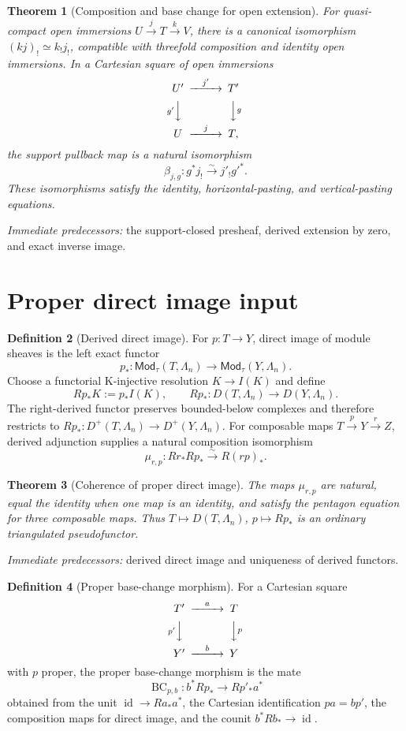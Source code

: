 \documentclass[10pt]{article}
\newtheorem{theorem}{Theorem}[section]
\theoremstyle{definition}
\newtheorem{definition}[theorem]{Definition}
\newcommand{\Mod}{\mathsf{Mod}}
\newcommand{\pred}[1]{\par\smallskip\begingroup\footnotesize\raggedright
\emph{Immediate predecessors:} #1.\par\endgroup}
\begin{document}
\begin{theorem}[Composition and base change for open extension]
For quasi-compact open immersions \(U\xrightarrow{j}T\xrightarrow{k}V\),
there is a canonical isomorphism
\((kj)_!\simeq k_!j_!\), compatible with threefold composition and identity
open immersions.  In a Cartesian square of open immersions
\[
\begin{CD}
 U'@>{j'}>>T'\\
 @V{g'}VV @VV{g}V\\
 U@>{j}>>T,
\end{CD}
\]
the support pullback map is a natural isomorphism
\[
 \beta_{j,g}:g^*j_!\xrightarrow{\sim}j'_!g'^*.
\]
These isomorphisms satisfy the identity, horizontal-pasting, and
vertical-pasting equations.
\end{theorem}
\pred{the support-closed presheaf, derived extension by zero, and exact inverse image}

\section{Proper direct image input}

\begin{definition}[Derived direct image]
For \(p:T\to Y\), direct image of module sheaves is the left exact functor
\[
 p_*:\Mod_\tau(T,\Lambda_n)\longrightarrow
      \Mod_\tau(Y,\Lambda_n).
\]
Choose a functorial K-injective resolution \(K\to I(K)\) and define
\[
 Rp_*K:=p_*I(K),\qquad
 Rp_*:D(T,\Lambda_n)\longrightarrow D(Y,\Lambda_n).
\]
The right-derived functor preserves bounded-below complexes and therefore
restricts to \(Rp_*:D^+(T,\Lambda_n)\to D^+(Y,\Lambda_n)\).
For composable maps \(T\xrightarrow{p}Y\xrightarrow{r}Z\), derived
adjunction supplies a natural composition isomorphism
\[
 \mu_{r,p}:Rr_*Rp_*\xrightarrow{\sim}R(rp)_*.
\]
\end{definition}

\begin{theorem}[Coherence of proper direct image]
The maps \(\mu_{r,p}\) are natural, equal the identity when one map is an
identity, and satisfy the pentagon equation for three composable maps.
Thus \(T\mapsto D(T,\Lambda_n)\), \(p\mapsto Rp_*\) is an ordinary
triangulated pseudofunctor.
\end{theorem}
\pred{derived direct image and uniqueness of derived functors}

\begin{definition}[Proper base-change morphism]
For a Cartesian square
\[
\begin{CD}
 T'@>{a}>>T\\
 @V{p'}VV @VV{p}V\\
 Y'@>{b}>>Y
\end{CD}
\]
with \(p\) proper, the proper base-change morphism is the mate
\[
 \operatorname{BC}_{p,b}:b^*Rp_*\longrightarrow Rp'_*a^*
\]
obtained from the unit \(\operatorname{id}\to Ra_*a^*\), the Cartesian
identification \(pa=bp'\), the composition maps for direct image, and the
counit \(b^*Rb_*\to\operatorname{id}\).
\end{definition}
\end{document}
